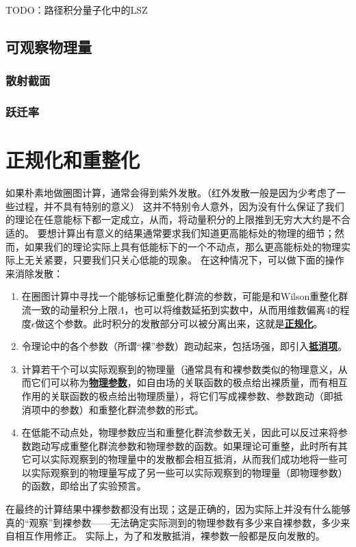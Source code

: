 \documentclass[hyperref, UTF8, a4paper]{ctexart}
\newcommand{\concept}[1]{\underline{\textbf{#1}}}
\begin{document}
TODO：路径积分量子化中的LSZ

\subsection{可观察物理量}

\subsubsection{散射截面}

\subsubsection{跃迁率}

\section{正规化和重整化}

如果朴素地做圈图计算，通常会得到紫外发散。（红外发散一般是因为少考虑了一些过程，并不具有特别的意义）
这并不特别令人意外，因为没有什么保证了我们的理论在任意能标下都一定成立，从而，将动量积分的上限推到无穷大大约是不合适的。
要想计算出有意义的结果通常要求我们知道更高能标处的物理的细节；然而，如果我们的理论实际上具有低能标下的一个不动点，那么更高能标处的物理实际上无关紧要，只要我们只关心低能的现象。
在这种情况下，可以做下面的操作来消除发散：
\begin{enumerate}
    \item 在圈图计算中寻找一个能够标记重整化群流的参数，可能是和Wilson重整化群流一致的动量积分上限$\Lambda$，也可以将维数延拓到实数中，从而用维数偏离$4$的程度$\epsilon$做这个参数。此时积分的发散部分可以被分离出来，这就是\concept{正规化}。
    \item 令理论中的各个参数（所谓“裸”参数）跑动起来，包括场强，即引入\concept{抵消项}。
    \item 计算若干个可以实际观察到的物理量（通常具有和裸参数类似的物理意义，从而它们可以称为\concept{物理参数}，如自由场的关联函数的极点给出裸质量，而有相互作用的关联函数的极点给出物理质量），将它们写成裸参数、参数跑动（即抵消项中的参数）和重整化群流参数的形式。
    \item 在低能不动点处，物理参数应当和重整化群流参数无关，因此可以反过来将参数跑动写成重整化群流参数和物理参数的函数。如果理论可重整，此时所有其它可以实际观察到的物理量中的发散都会相互抵消，从而我们成功地将一些可以实际观察到的物理量写成了另一些可以实际观察到的物理量（即物理参数）的函数，即给出了实验预言。
\end{enumerate}
在最终的计算结果中裸参数都没有出现；这是正确的，因为实际上并没有什么能够真的“观察”到裸参数——无法确定实际测到的物理参数有多少来自裸参数，多少来自相互作用修正。
实际上，为了和发散抵消，裸参数一般都是反向发散的。
\end{document}
